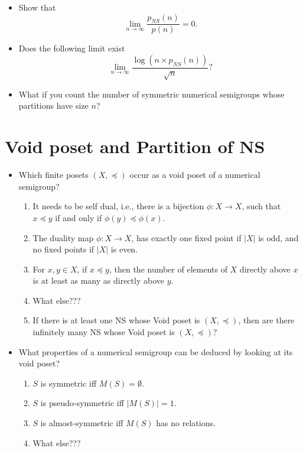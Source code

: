 \documentclass{article}
\theoremstyle{definition}
\theoremstyle{definition}
\theoremstyle{definition}
\begin{document}
\begin{itemize}
    \item Show that
    \[\lim_{n\to\infty} \frac{p_{NS}(n)}{p(n)}=0.\]
    \item Does the following limit exist
    \[\lim_{n\to\infty} \frac{\log(n\times p_{NS}(n))}{\sqrt{n}}?\]
    \item What if you count the number of symmetric numerical semigroups whose partitions have size $n$?
\end{itemize}


\section{Void poset and Partition of NS}
\begin{itemize}
    \item Which finite posets $(X,\preccurlyeq)$ occur as a void poset of a numerical semigroup?
    \begin{enumerate}
        \item It needs to be self dual, i.e., there is a bijection $\phi:X\to X$, such that $x\preccurlyeq y$ if and only if $\phi(y)\preccurlyeq \phi(x)$.
        \item The duality map $\phi: X\to X$, has exactly one fixed point if $|X|$ is odd, and no fixed points if $|X|$ is even.
        \item For $x,y\in X$, if $x\preccurlyeq y$, then the number of elements of $X$ directly above $x$ is at least as many as directly above $y$.
        \item What else???
        \item If there is at least one NS whose Void poset is $(X,\preccurlyeq)$, then are there infinitely many NS whose Void poset is $(X,\preccurlyeq)$?
    \end{enumerate}
    \item What properties of a numerical semigroup can be deduced by looking at its void poset?
    \begin{enumerate}
        \item $S$ is symmetric iff $M(S)=\emptyset$.
        \item $S$ is pseudo-symmetric iff $|M(S)|=1$.
        \item $S$ is almost-symmetric iff $M(S)$ has no relations.
        \item What else???
    \end{enumerate}


\end{itemize}
\end{document}
